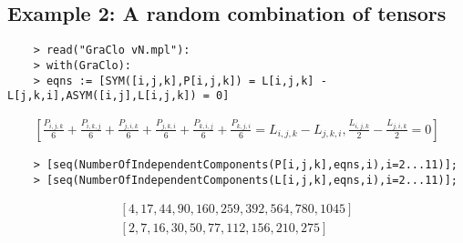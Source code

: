 \documentclass{article}
\begin{document}
\subsection*{Example 2: A random combination of tensors}
\begin{verbatim}
    > read("GraClo vN.mpl"):
    > with(GraClo):
    > eqns := [SYM([i,j,k],P[i,j,k]) = L[i,j,k] - L[j,k,i],ASYM([i,j],L[i,j,k]) = 0]
\end{verbatim}
\begin{equation*}
    \begin{split}
        [{\frac {P_{{i,j,k}}}{6}}+{\frac {P_{{i,k,j}}}{6}}+{\frac {P_{{j,i,k}}
}{6}}+{\frac {P_{{j,k,i}}}{6}}+{\frac {P_{{k,i,j}}}{6}}+{\frac {P_{{k,
j,i}}}{6}}=L_{{i,j,k}}-L_{{j,k,i}},{\frac {L_{{i,j,k}}}{2}}-{\frac {L_
{{j,i,k}}}{2}}=0]
    \end{split}
\end{equation*}
\begin{verbatim}
    > [seq(NumberOfIndependentComponents(P[i,j,k],eqns,i),i=2...11)];
    > [seq(NumberOfIndependentComponents(L[i,j,k],eqns,i),i=2...11)];
\end{verbatim}
\begin{equation*}
    \begin{split}
        [4,17,44,90,160,259,392,564,780,1045]\\
[2,7,16,30,50,77,112,156,210,275]
    \end{split}
\end{equation*}
\end{document}
